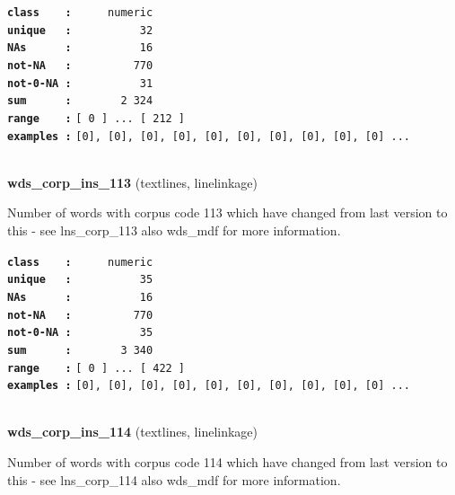 \documentclass[]{article}
\begin{document}
\textbf{\texttt{class\ \ \ \ :}} \texttt{~~~~~numeric}\\
\textbf{\texttt{unique\ \ \ :}} \texttt{~~~~~~~~~~32}\\
\textbf{\texttt{NAs\ \ \ \ \ \ :}} \texttt{~~~~~~~~~~16}\\
\textbf{\texttt{not-NA\ \ \ :}} \texttt{~~~~~~~~~770}\\
\textbf{\texttt{not-0-NA\ :}} \texttt{~~~~~~~~~~31}\\
\textbf{\texttt{sum\ \ \ \ \ \ :}} \texttt{~~~~~~~2~324}\\
\textbf{\texttt{range\ \ \ \ :}}
\texttt{{[}\ 0\ {]}\ ...\ {[}\ 212\ {]}}\\
\textbf{\texttt{examples\ :}}
\texttt{{[}0{]},\ {[}0{]},\ {[}0{]},\ {[}0{]},\ {[}0{]},\ {[}0{]},\ {[}0{]},\ {[}0{]},\ {[}0{]},\ {[}0{]}\ ...}\\

~

\textbf{wds\_corp\_ins\_113} (textlines, linelinkage)

Number of words with corpus code 113 which have changed from last
version to this - see lns\_corp\_113 also wds\_mdf for more information.

\textbf{\texttt{class\ \ \ \ :}} \texttt{~~~~~numeric}\\
\textbf{\texttt{unique\ \ \ :}} \texttt{~~~~~~~~~~35}\\
\textbf{\texttt{NAs\ \ \ \ \ \ :}} \texttt{~~~~~~~~~~16}\\
\textbf{\texttt{not-NA\ \ \ :}} \texttt{~~~~~~~~~770}\\
\textbf{\texttt{not-0-NA\ :}} \texttt{~~~~~~~~~~35}\\
\textbf{\texttt{sum\ \ \ \ \ \ :}} \texttt{~~~~~~~3~340}\\
\textbf{\texttt{range\ \ \ \ :}}
\texttt{{[}\ 0\ {]}\ ...\ {[}\ 422\ {]}}\\
\textbf{\texttt{examples\ :}}
\texttt{{[}0{]},\ {[}0{]},\ {[}0{]},\ {[}0{]},\ {[}0{]},\ {[}0{]},\ {[}0{]},\ {[}0{]},\ {[}0{]},\ {[}0{]}\ ...}\\

~

\textbf{wds\_corp\_ins\_114} (textlines, linelinkage)

Number of words with corpus code 114 which have changed from last
version to this - see lns\_corp\_114 also wds\_mdf for more information.
\end{document}
